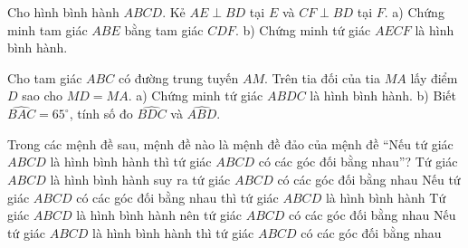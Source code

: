 \begin{bt}%
	Cho hình bình hành $ABCD$. Kẻ $AE \perp BD$ tại $E$ và $CF \perp BD$ tại $F$.
a) Chứng minh tam giác $ABE$ bằng tam giác $CDF$.
b) Chứng minh tứ giác $AECF$ là hình bình hành.
\end{bt}

\begin{bt}%
	Cho tam giác $ABC$ có đường trung tuyến $AM$. Trên tia đối của tia $MA$ lấy điểm $D$ sao cho $MD = MA$.
a) Chứng minh tứ giác $ABDC$ là hình bình hành.
b) Biết $\widehat{BAC} = 65^\circ$, tính số đo $\widehat{BDC}$ và $\widehat{ABD}$.
\end{bt}

\begin{ex}%
	Trong các  mệnh đề sau, mệnh đề nào là mệnh đề đảo của mệnh đề “Nếu tứ giác $ABCD$ là hình bình hành thì tứ giác $ABCD$ có các góc đối bằng nhau”?
	\choice 
		{Tứ giác $ABCD$ là hình bình hành suy ra tứ giác $ABCD$  có các góc đối bằng nhau}
		{\True Nếu tứ giác $ABCD$ có các góc đối bằng nhau  thì tứ giác $ABCD$ là hình bình hành}
		{Tứ giác $ABCD$ là  hình bình hành nên tứ giác $ABCD$ có các góc đối bằng nhau}
		{Nếu tứ giác $ABCD$ là hình bình hành thì tứ giác $ABCD$ có các góc đối bằng nhau} 
\end{ex}

